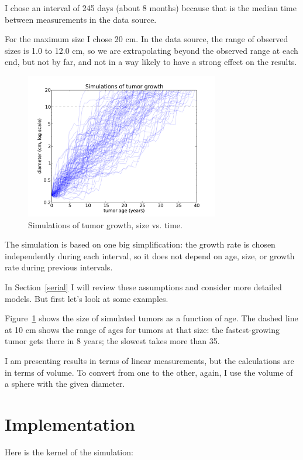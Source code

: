 \documentclass[12pt]{book}
\begin{document}
I chose an interval of 245 days (about 8 months) because that is the
median time between measurements in the data source.

For the maximum size I chose 20 cm.  In the data source, the range of
observed sizes is 1.0 to 12.0 cm, so we are extrapolating beyond
the observed range at each end, but not by far, and not in a way
likely to have a strong effect on the results.

\begin{figure}
\centerline{\includegraphics[height=2.5in]{figs/kidney4.pdf}}
\caption{Simulations of tumor growth, size vs. time.}
\label{fig.kidney4}
\end{figure}

The simulation is based on one big simplification:
the growth rate is chosen independently during each interval,
so it does not depend on age, size, or growth rate during
previous intervals.

In Section~\ref{serial} I will review these assumptions and
consider more detailed models.  But first let's look at some
examples.

Figure~\ref{fig.kidney4} shows 
the size of simulated tumors as a function of
age.  The dashed line at 10 cm shows the range of ages for tumors at
that size: the fastest-growing tumor gets there in 8 years; the
slowest takes more than 35.

I am presenting results in terms of linear measurements, but the
calculations are in terms of volume.  To convert from one to the
other, again, I use the volume of a sphere with the given
diameter.


\section{Implementation}

Here is the kernel of the simulation:
\end{document}
